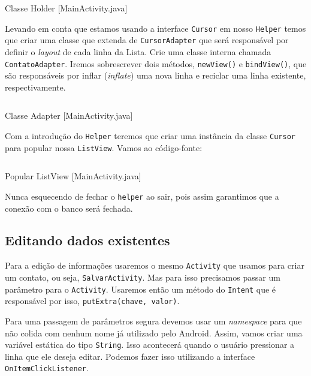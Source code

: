 \begin{listing}[H]
  \inputminted[linenos=true,frame=bottomline,tabsize=3]{ java }{ source/MainActivity-4.java }
  \caption{Classe Holder [MainActivity.java]}
\end{listing}

Levando em conta que estamos usando a interface \texttt{Cursor} em nosso
\texttt{Helper} temos que criar uma classe que extenda de
\texttt{CursorAdapter} que será responsável por definir o \emph{layout}
de cada linha da Lista. Crie uma classe interna chamada
\texttt{ContatoAdapter}. Iremos sobrescrever dois métodos,
\texttt{newView()} e \texttt{bindView()}, que são responsáveis por
inflar (\emph{inflate}) uma nova linha e reciclar uma linha existente,
respectivamente.

\begin{listing}[H]
  \inputminted[linenos=true,frame=bottomline,tabsize=3]{ java }{ source/MainActivity-5.java }
  \caption{Classe Adapter [MainActivity.java]}
\end{listing}

Com a introdução do \texttt{Helper} teremos que criar uma instância da
classe \texttt{Cursor} para popular nossa \texttt{ListView}. Vamos ao
código-fonte:

\begin{listing}[H]
  \inputminted[linenos=true,frame=bottomline,tabsize=3]{ java }{ source/MainActivity-6.java }
  \caption{Popular ListView [MainActivity.java]}
\end{listing}

Nunca esquecendo de fechar o \texttt{helper} ao sair, pois assim
garantimos que a conexão com o banco será fechada.

\subsection{Editando dados existentes \label{ssec:edit}}

Para a edição de informações usaremos o mesmo \texttt{Activity} que
usamos para criar um contato, ou seja, \texttt{SalvarActivity}. Mas para
isso precisamos passar um parâmetro para o \texttt{Activity}. Usaremos
então um método do \texttt{Intent} que é responsável por isso,
\texttt{putExtra(chave, valor)}.

Para uma passagem de parâmetros segura devemos usar um \emph{namespace}
para que não colida com nenhum nome já utilizado pelo Android. Assim,
vamos criar uma variável estática do tipo \texttt{String}. Isso
acontecerá quando o usuário pressionar a linha que ele deseja editar.
Podemos fazer isso utilizando a interface \texttt{OnItemClickListener}.

